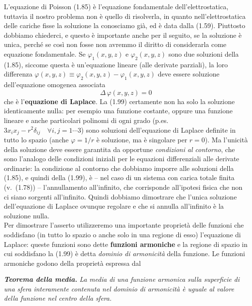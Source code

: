 L'equazione di Poisson (1.85) è l'equazione fondamentale dell'elettrostatica, tuttavia il nostro problema non è quello di risolverla, in quanto nell'elettrostatica delle cariche fisse la soluzione la conosciamo già, ed è data dalla (1.59). Piuttosto dobbiamo chiederci, e questo è importante anche per il seguito, se la soluzione è unica, perché se così non fosse non avremmo il diritto di considerarla come equazione fondamentale. Se $\varphi_1(x,y,z)$ e $\varphi_2(x,y,z)$ sono due soluzioni della (1.85), siccome questa è un'equazione lineare (alle derivate parziali), la loro differenza $\varphi(x,y,z)\equiv\varphi_2(x,y,z)-\varphi_1(x,y,z)$ deve essere soluzione dell'equazione omogenea associata
\begin{equation}
\Delta\,\varphi(x,y,z)=0
\tag{1.99}
\end{equation}
che è l'\textbf{equazione di Laplace}. La (1.99) certamente non ha solo la soluzione identicamente nulla: per esempio una funzione costante, oppure una funzione lineare e anche particolari polinomi di ogni grado (p.es.\ $3x_ix_j-r^2\delta_{ij}\quad\forall i,j=1\cdots3$) sono soluzioni dell'equazione di Laplace definite in tutto lo spazio (anche $\varphi=1/r$ è soluzione, ma è singolare per $r=0$). Ma l'unicità della soluzione deve essere garantita da opportune \emph{condizioni al contorno}, che sono l'analogo delle condizioni iniziali per le equazioni differenziali alle derivate ordinarie: la condizione al contorno che dobbiamo imporre alle soluzioni della (1.85), e quindi della (1.99), è -- nel caso di un sistema con carica totale finita \big(v.\ (1.78)\big) -- l'annullamento all'infinito, che corrisponde all'ipotesi fisica che non ci siano sorgenti all'infinito. Quindi dobbiamo dimostrare che l'unica soluzione dell'equazione di Laplace ovunque regolare e che si annulla all'infinito è la soluzione nulla.\\
Per dimostrare l'asserto utilizzeremo una importante proprietà delle funzioni che soddisfano (in tutto lo spazio o anche solo in una regione di esso) l'equazione di Laplace: queste funzioni sono dette \textbf{funzioni armoniche} e la regione di spazio in cui soddisfano la (1.99) è detta \emph{dominio di armonicità} della funzione. Le funzioni armoniche godono della proprietà espressa dal

\textbf{\textit{Teorema della media.}} \textit{La media di una funzione armonica sulla superficie di una sfera interamente contenuta nel dominio di armonicità è uguale al valore della funzione nel centro della sfera.}

